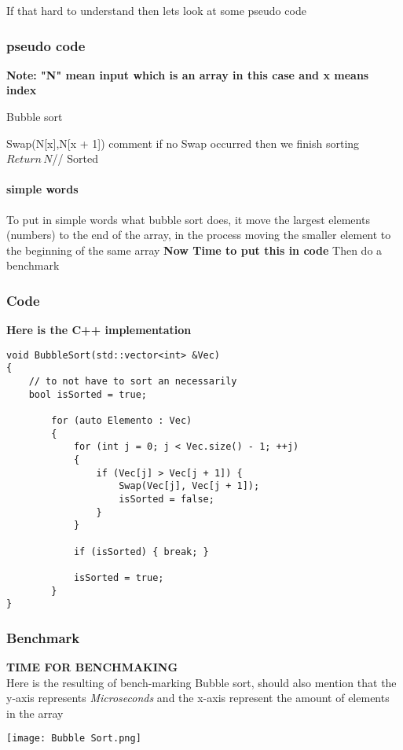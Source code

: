 \documentclass{article}
\begin{document}
If that hard to understand then lets look at some pseudo code 

\subsubsection{pseudo code}
\textbf{Note: "N" mean input which is an array in this case and x means index }\\
\begin{algorithm}
\caption{Bubble sort}
\begin{algorithmic}[1] %
\State Swap(N[x],N[x + 1])
\EndIf
\EndFor
\State comment if no Swap occurred then we finish sorting
\EndFor
\State $Return\,N$// Sorted
\end{algorithmic}
\end{algorithm}
\paragraph{simple words}
To put in simple words what bubble sort does, it move the largest elements (numbers) to the end of the array, in the process moving the smaller element to the beginning of the same array \textbf{Now Time to put this in code } Then do a benchmark 

\subsubsection{Code}

\textbf{Here is the C++ implementation}
\begin{lstlisting} 
void BubbleSort(std::vector<int> &Vec) 
{
	// to not have to sort an necessarily
	bool isSorted = true;

		for (auto Elemento : Vec) 
		{
			for (int j = 0; j < Vec.size() - 1; ++j)
			{
				if (Vec[j] > Vec[j + 1]) {
					Swap(Vec[j], Vec[j + 1]);
					isSorted = false;
				}
			}
			
			if (isSorted) { break; }

			isSorted = true;
		}
}

\end{lstlisting}
\subsubsection{Benchmark} \label{subsub:Benc}
\textbf{TIME FOR BENCHMAKING }
\\
Here is the resulting of bench-marking Bubble sort, should also mention that the y-axis represents \textit{Microseconds} and the x-axis represent the amount of elements in the array
\begin{center}
\texttt{[image: Bubble Sort.png]} 
\end{center}
\end{document}
